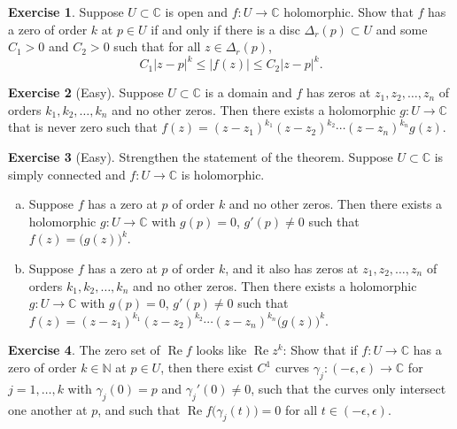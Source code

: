 \documentclass[12pt,openany]{book}
\renewcommand{\Re}{\operatorname{Re}}
\newcommand{\sabs}[1]{\lvert {#1} \rvert}
\newcommand{\C}{{\mathbb{C}}}
\newcommand{\N}{{\mathbb{N}}}
\theoremstyle{plain}
\theoremstyle{remark}
\theoremstyle{definition}
\newenvironment{exbox}{%
    \def\FrameCommand{\vrule width 1pt \relax\hspace{10pt}}%
    \MakeFramed{\advance\hsize-\width\FrameRestore}%
}{%
    \endMakeFramed
}
\newenvironment{exparts}{%
    \leavevmode\begin{enumerate}[a),noitemsep,topsep=0pt,parsep=0pt,partopsep=0pt]
}{%
    \end{enumerate}
}
\theoremstyle{exercise}
\newtheorem{exercise}{Exercise}[section]
\theoremstyle{example}
\begin{document}
\begin{exbox}
\begin{exercise}%
\label{exercise:order}
Suppose $U \subset \C$ is open and
$f \colon U \to \C$ holomorphic.
Show that $f$ has a zero of order $k$ at $p \in U$
if and only if
there is a disc $\Delta_r(p) \subset U$ and some $C_1 > 0$ and $C_2 > 0$
such that for
all $z \in \Delta_r(p)$,
\begin{equation*}
C_1 {\sabs{z-p}}^k
\leq
\sabs{f(z)}
\leq
C_2 {\sabs{z-p}}^k .
\end{equation*}
\end{exercise}

\begin{exercise}[Easy]
Suppose $U \subset \C$ is a domain and $f$ 
has zeros at $z_1, z_2, \ldots, z_n$ of
orders $k_1, k_2, \ldots, k_n$ and no other zeros.
Then there exists a holomorphic
$g \colon U \to \C$ that is never zero
such that $f(z) = {(z-z_1)}^{k_1}{(z-z_2)}^{k_2}\cdots{(z-z_n)}^{k_n} g(z).$
\end{exercise}

\begin{exercise}[Easy]
\pagebreak[2]
Strengthen the statement of the theorem.
Suppose $U \subset \C$ is simply connected and $f \colon U \to \C$
is holomorphic.
\begin{exparts}
\item
Suppose $f$ has a zero at $p$ of
order $k$ and no other zeros.
Then there exists a holomorphic
$g \colon U \to \C$ with $g(p) = 0$, $g'(p) \not= 0$
such that $f(z) = {\bigl( g(z) \bigr)}^k$.
\item
Suppose $f$ has a zero at $p$
of order $k$,
and it also has zeros at $z_1, z_2, \ldots, z_n$ of
orders $k_1, k_2, \ldots, k_n$ and no other zeros.
Then there exists a holomorphic
$g \colon U \to \C$ with $g(p) = 0$, $g'(p) \not= 0$
such that $f(z) = {(z-z_1)}^{k_1}{(z-z_2)}^{k_2}\cdots{(z-z_n)}^{k_n} {\bigl( g(z) \bigr)}^k$.
\end{exparts}
\end{exercise}

\begin{exercise}
The zero set of $\Re f$ looks like $\Re z^k$:
Show that if $f \colon U \to \C$ has a zero of order $k \in \N$ at $p \in
U$, then there exist $C^1$ curves
$\gamma_j \colon (-\epsilon, \epsilon) \to \C$ for
$j=1,\ldots,k$ with $\gamma_j(0) = p$
and $\gamma_j'(0) \not= 0$, such that the curves only intersect
one another
at $p$, and such that $\Re f\bigl( \gamma_j(t) \bigr) = 0$ for
all $t \in (-\epsilon,\epsilon)$.
\end{exercise}


\end{exbox}
\end{document}

